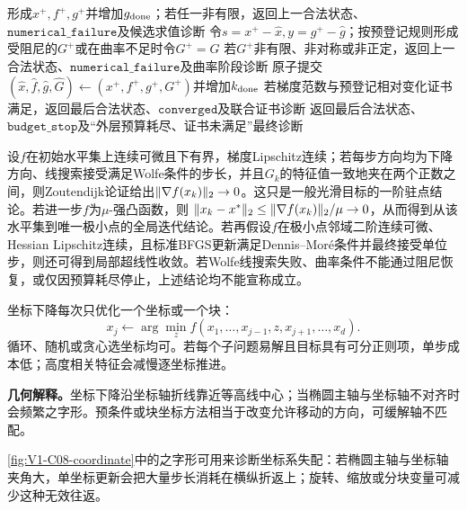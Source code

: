 \begin{AlgorithmContract}
\begin{algorithm}[H]
{  形成$x^+,f^+,g^+$并增加$g_{\rm done}$；若任一非有限，返回上一合法状态、$\mathtt{numerical\_failure}$及候选求值诊断\;
  令$s=x^+-\widehat x,y=g^+-\widehat g$；按预登记规则形成受阻尼的$G^+$或在曲率不足时令$G^+=\widehat G$\;
  若$G^+$非有限、非对称或非正定，返回上一合法状态、$\mathtt{numerical\_failure}$及曲率阶段诊断\;
  原子提交$(\widehat x,\widehat f,\widehat g,\widehat G)\leftarrow(x^+,f^+,g^+,G^+)$并增加$k_{\rm done}$\;
  若梯度范数与预登记相对变化证书满足，返回最后合法状态、$\mathtt{converged}$及联合证书诊断\;
}
返回最后合法状态、$\mathtt{budget\_stop}$及“外层预算耗尽、证书未满足”最终诊断\;
\end{algorithm}
\end{AlgorithmContract}

\begin{theorem}[BFGS结论的适用层次]
设$f$在初始水平集上连续可微且下有界，梯度Lipschitz连续；若每步方向均为下降方向、线搜索接受满足Wolfe条件的步长，并且$G_k$的特征值一致地夹在两个正数之间，则Zoutendijk论证给出$\lVert\nabla f(x_k)\rVert_2\to0$。这只是一般光滑目标的一阶驻点结论。若进一步$f$为$\mu$-强凸函数，则
$\lVert x_k-x^*\rVert_2\le\lVert\nabla f(x_k)\rVert_2/\mu\to0$，从而得到从该水平集到唯一极小点的全局迭代结论。若再假设$f$在极小点邻域二阶连续可微、Hessian Lipschitz连续，且标准BFGS更新满足Dennis--Mor\'e条件并最终接受单位步，则还可得到局部超线性收敛。若Wolfe线搜索失败、曲率条件不能通过阻尼恢复，或仅因预算耗尽停止，上述结论均不能宣称成立。
\end{theorem}


坐标下降每次只优化一个坐标或一个块：
\[
x_j\leftarrow\arg\min_z f(x_1,\ldots,x_{j-1},z,x_{j+1},\ldots,x_d).
\]
循环、随机或贪心选坐标均可。若每个子问题易解且目标具有可分正则项，单步成本低；高度相关特征会减慢逐坐标推进。

\label{struct:V1-C08-CH16}
\begin{geometrybox}
\textbf{几何解释。}坐标下降沿坐标轴折线靠近等高线中心；当椭圆主轴与坐标轴不对齐时会频繁之字形。预条件或块坐标方法相当于改变允许移动的方向，可缓解轴不匹配。
\end{geometrybox}

\label{struct:V1-C08-CH19}

\cref{fig:V1-C08-coordinate}中的之字形可用来诊断坐标系失配：若椭圆主轴与坐标轴夹角大，单坐标更新会把大量步长消耗在横纵折返上；旋转、缩放或分块变量可减少这种无效往返。


